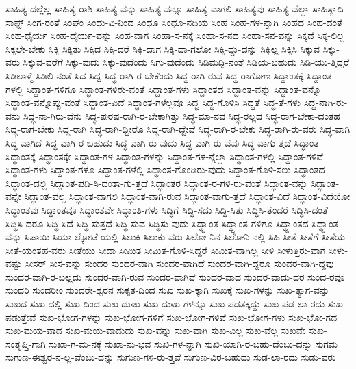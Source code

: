 {ಸಾಹಿತ್ಯ-ದಲ್ಲೆಲ್ಲ
ಸಾಹಿತ್ಯ-ರಾಶಿ
ಸಾಹಿತ್ಯ-ವನ್ನು
ಸಾಹಿತ್ಯ-ವನ್ನೂ
ಸಾಹಿತ್ಯ-ವಾಗಲಿ
ಸಾಹಿತ್ಯವು
ಸಾಹಿತ್ಯ-ವೆಲ್ಲಾ
ಸಾಹಿತ್ಯಾದಿ
ಸಾಫ್ಟ್
ಸಿಂಗ-ರಂತೆ
ಸಿಂಘಂ
ಸಿಂಧು-ವಿ-ನಿಂದ
ಸಿಂಧೂ
ಸಿಂಧೂ-ನದಿಯ
ಸಿಂಹ
ಸಿಂಹ-ಗಳ-ನ್ನಾಗಿ
ಸಿಂಹದ
ಸಿಂಹ-ದಂತೆ
ಸಿಂಹ-ಧೈರ್ಯ
ಸಿಂಹ-ಧೈರ್ಯ-ವನ್ನು
ಸಿಂಹ-ವಾಗ
ಸಿಂಹಾ-ಸ-ನಕ್ಕೆ
ಸಿಂಹಾ-ಸ-ನದ
ಸಿಂಹಾ-ಸನ-ವನ್ನು
ಸಿಕ್ಕದೆ
ಸಿಕ್ಕ-ಲಿಲ್ಲ
ಸಿಕ್ಕಲೇ-ಬೇಕು
ಸಿಕ್ಕಿ
ಸಿಕ್ಕಿತು
ಸಿಕ್ಕಿದ
ಸಿಕ್ಕಿ-ದರೆ
ಸಿಕ್ಕಿ-ದಾಗ
ಸಿಕ್ಕಿ-ದಾ-ಗಲೋ
ಸಿಕ್ಕಿ-ದ್ದು-ದನ್ನು
ಸಿಕ್ಕಿಲ್ಲ
ಸಿಕ್ಕಿಸಿ
ಸಿಕ್ಕುವ
ಸಿಕ್ಕು-ವರು
ಸಿಕ್ಕುವ-ವರೆಗೆ
ಸಿಕ್ಕು-ವುದು
ಸಿಕ್ಕು-ವುದೆಂದು
ಸಿಗು-ವುದೆಂದು
ಸಿಡಿಮದ್ದಿ-ನಂತೆ
ಸಿಡಿಯ-ಬಹುದು
ಸಿಡಿ-ಯು-ತ್ತಿದ್ದರೆ
ಸಿಡಿಲಾಳ್ಮೆ
ಸಿಡಿಲಿ-ನಂತೆ
ಸಿದ
ಸಿದ್ದ
ಸಿದ್ಧ-ರಾಗಿ-ರ-ಬೇಕೆಂದು
ಸಿದ್ಧ-ರಾಗಿ-ರುವ
ಸಿದ್ಧ-ರಾಗೋಣ
ಸಿದ್ದಾಂತಕ್ಕೆ
ಸಿದ್ದಾಂತ-ಗಳಲ್ಲಿ
ಸಿದ್ಧಾಂತ-ಗಳಿಗೂ
ಸಿದ್ಧಾಂತ-ಗಳಿರು-ವಂತೆ
ಸಿದ್ದಾಂತ-ಗಳು
ಸಿದ್ದಾಂತದ
ಸಿದ್ದಾಂತ-ವನ್ನು
ಸಿದ್ಧಾಂತ-ವನ್ನೊ
ಸಿದ್ಧಾಂತ-ವನ್ನೊಪ್ಪು-ವಂತೆ
ಸಿದ್ದಾಂತ-ವಿದೆ
ಸಿದ್ಧಾಂತ-ಗಳೆಲ್ಲವೂ
ಸಿದ್ಧ
ಸಿದ್ಧ-ಗೊಳಿಸಿ
ಸಿದ್ಧತೆ
ಸಿದ್ಧ-ತೆ-ಗಳು
ಸಿದ್ಧ-ನಾಗಿ-ರು-ವನು
ಸಿದ್ಧ-ನಾ-ಗಿರು-ವೆನು
ಸಿದ್ಧ-ಪುರಷ-ರಾಗಿ-ರ-ಬೇಕಾಗಿತ್ತು
ಸಿದ್ಧ-ಮಾ-ನವ
ಸಿದ್ಧ-ರಲ್ಲದ
ಸಿದ್ಧ-ರಾಗ-ಬೇಕಾ-ದಂತಹ
ಸಿದ್ಧ-ರಾಗ-ಬೇಕು
ಸಿದ್ಧ-ರಾಗಿ
ಸಿದ್ಧ-ರಾಗಿ-ದ್ದೀರೊ
ಸಿದ್ಧ-ರಾಗಿ-ದ್ದೇವೆ
ಸಿದ್ಧ-ರಾಗಿ-ರ-ಬೇಕು
ಸಿದ್ಧ-ರಾಗಿ-ರು-ವರು
ಸಿದ್ಧ-ವಾಗಿ
ಸಿದ್ಧ-ವಾಗಿದೆ
ಸಿದ್ಧ-ವಾಗಿ-ರ-ಬಹುದು
ಸಿದ್ಧ-ವಾಗಿ-ರು-ವುದು
ಸಿದ್ಧ-ವಾಗಿ-ರು-ವೆವು
ಸಿದ್ಧ-ವಾಗು-ತ್ತದೆ
ಸಿದ್ಧಾಂತ
ಸಿದ್ಧಾಂತಕ್ಕೆ
ಸಿದ್ಧಾಂತಕ್ಕೇ
ಸಿದ್ಧಾಂತ-ಗಳ
ಸಿದ್ಧಾಂತ-ಗಳನ್ನು
ಸಿದ್ಧಾಂತ-ಗಳ-ನ್ನೆಲ್ಲಾ
ಸಿದ್ಧಾಂತ-ಗಳಲ್ಲಿ
ಸಿದ್ಧಾಂತ-ಗಳಿವೆ
ಸಿದ್ಧಾಂತ-ಗಳು
ಸಿದ್ಧಾಂತ-ಗಳೂ
ಸಿದ್ಧಾಂತ-ಗಳೆಲ್ಲಿ
ಸಿದ್ಧಾಂತ-ಗೊಂಡಿರು-ವುದು
ಸಿದ್ಧಾಂತ-ಗೊಳಿ-ಸಲು
ಸಿದ್ಧಾಂತದ
ಸಿದ್ಧಾಂತ-ದಲ್ಲಿ
ಸಿದ್ಧಾಂತ-ಪಡಿ-ಸಿ-ದಂತಾ-ಗು-ತ್ತದೆ
ಸಿದ್ಧಾಂತರ
ಸಿದ್ಧಾಂತ-ರ-ಗಳಿ-ರು-ವಂತೆ
ಸಿದ್ಧಾಂತ-ವನ್ನು
ಸಿದ್ಧಾಂತ-ವನ್ನೇ
ಸಿದ್ಧಾಂತ-ವಲ್ಲ
ಸಿದ್ಧಾಂತ-ವಾಗಲಿ
ಸಿದ್ಧಾಂತ-ವಾಗಿ-ರುವ
ಸಿದ್ಧಾಂತ-ವಾಗು-ತ್ತದೆ
ಸಿದ್ಧಾಂತ-ವಿದೆ
ಸಿದ್ಧಾಂತ-ವಿದೆಯೋ
ಸಿದ್ಧಾಂತವು
ಸಿದ್ಧಾಂತವೂ
ಸಿದ್ಧಾಂತವೇ
ಸಿದ್ಧಾಂತಿ-ಗಳು
ಸಿದ್ಧಿಗೆ
ಸಿದ್ಧಿ-ಸದು
ಸಿದ್ಧಿ-ಸಿತು
ಸಿದ್ಧಿಸಿ-ತೆಂದರೆ
ಸಿದ್ಧಿಸಿ-ದಂತೆ
ಸಿದ್ಧಿಸಿ-ದರೂ
ಸಿದ್ಧಿ-ಸಿದೆ
ಸಿದ್ಧಿ-ಸುತ್ತದೆ
ಸಿದ್ಧಿ-ಸುವ
ಸಿದ್ಧಿಸು-ವುದು
ಸಿದ್ಧ್ದಾಂತ
ಸಿದ್ಧ್ದಾಂತ-ಗಳಿಗೂ
ಸಿದ್ಧ್ದಾಂತದ
ಸಿದ್ಧ್ದಾಂತ-ವನ್ನು
ಸಿಪಾಯಿ
ಸಿಯಾ-ಲ್ಕೋಟೆ-ಯಲ್ಲಿ
ಸಿಲುಕಿ
ಸಿಲುಕು-ವರು
ಸಿಲೋ-ನಿನ
ಸಿಲೋನಿ-ನಲ್ಲಿ
ಸಿಹಿ
ಸೀತೆ
ಸೀತೆಗೆ
ಸೀತೆಯ
ಸೀತೆ-ಯಂತಹ-ವರು
ಸೀತೆಯು
ಸೀದಾ
ಸೀಮಿತ
ಸೀಮಿತ-ಗೊಳಿ-ಸಿದ್ದರೆ
ಸೀಮಿತ-ವಾಗಿಲ್ಲ
ಸೀಳಿ
ಸೀಳುತ್ತಿರು-ವಾಗ
ಸೀಳು-ವಷ್ಟು
ಸೀಸರ್
ಸೀಸ-ವನ್ನು
ಸುಂದರ
ಸುಂದರ-ವಾಗಿ
ಸುಂದರ-ವಾಗಿದೆ
ಸುಂದರ-ವಾಗಿ-ದ್ದರೂ
ಸುಂದರ-ವಾಗಿ-ದ್ದವು
ಸುಂದರ-ವಾಗಿ-ರ-ಬಲ್ಲದು
ಸುಂದರ-ವಾಗಿ-ರುವ
ಸುಂದರ-ವಾಗಿವೆ
ಸುಂದರ-ವಾದ
ಸುಂದರ-ವಾದು-ದರ
ಸುಂದ-ರವೂ
ಸುಂದರಿ
ಸುಂದರೀಂ
ಸುಂದರೇ-ಶ್ವರನ
ಸುಕೃತ-ದಿಂದ
ಸುಖ
ಸುಖ-ಕ್ಕಾಗಿ
ಸುಖಕ್ಕೆ
ಸುಖ-ಗಳನ್ನು
ಸುಖ-ತ್ಯಾಗ-ವನ್ನು
ಸುಖದ
ಸುಖ-ದಲ್ಲಿ
ಸುಖ-ದಿಂದ
ಸುಖ-ದುಃಖ
ಸುಖ-ದುಃಖ-ಗಳನ್ನೂ
ಸುಖ-ಪಡತಕ್ಕದ್ದು
ಸುಖ-ಪಡ-ಲಾ-ರದು
ಸುಖ-ಪಡುತ್ತೇವೆ
ಸುಖ-ಭೋಗ-ಗಳನ್ನು
ಸುಖ-ಭೋಗ-ಗಳಿಗೆ
ಸುಖ-ಭೋಗ-ಗಳಿವೆ
ಸುಖ-ಭೋಗ-ಗಳು
ಸುಖ-ಭೋ-ಗದ
ಸುಖ-ಮಯ-ವಾದ
ಸುಖ-ಮಯ-ವಾದುದು
ಸುಖ-ವನ್ನು
ಸುಖ-ವಾಗಿ
ಸುಖ-ವಿಲ್ಲ
ಸುಖ-ವೆಲ್ಲ
ಸುಖವೇ
ಸುಖ-ಸಂತೃಪ್ತಿ-ಗಾಗಿ
ಸುಖಾ-ಗ-ಮ-ನಕ್ಕೆ
ಸುಖಾ-ನು-ಭವ
ಸುಖಿ-ಗಳ-ನ್ನಾಗಿ
ಸುಖಿ-ಯಾಗಿ-ರ-ಬಹು-ದೆಂಬು-ದನ್ನು
ಸುಗಮ
ಸುಗುಣ-ಈಶ್ವರ-ನ-ಲ್ಲ-ವೆಂಬು-ದನ್ನು
ಸುಗುಣ-ಗಳಿ-ರು-ತ್ತವೆ
ಸುಗುಣ-ವಿರ-ಬಹುದು
ಸುಡ-ಲಾ-ರದು
ಸುಡು-ವರು
}
